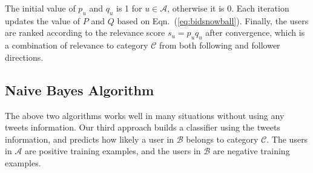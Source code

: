 \documentclass{article}
\begin{document}

The initial value of $p_u$ and $q_u$ is 1 for $u \in \mathcal{A}$, otherwise it is 0. Each iteration updates the value of $P$ and $Q$ based on Eqn.~(\ref{eq:bidsnowball}). Finally, the users are ranked according to the relevance score $s_u = p_u q_u$ after convergence, which is a combination of relevance to category $\mathcal{C}$ from both following and follower directions.

\subsection{Naive Bayes Algorithm}

The above two algorithms works well in many situations without using any tweets information. %
Our third approach builds a classifier using the tweets information, and predicts how likely a user in $\mathcal{B}$ belongs to category $\mathcal{C}$. The users in $\mathcal{A}$ are positive training examples, and the users in $\mathcal{B}$ are negative training examples.
\end{document}
